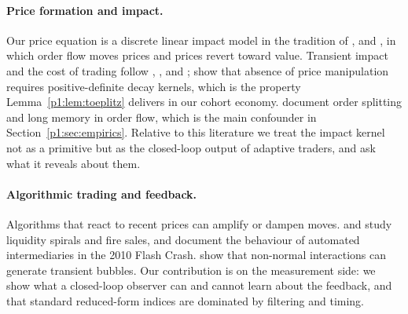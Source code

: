 \paragraph{Price formation and impact.} Our price equation is a discrete linear impact model in the tradition of \citet{p1:kyle1985}, \citet{p1:glosten1985} and \citet{p1:hasbrouck1991}, in which order flow moves prices and prices revert toward value. Transient impact and the cost of trading follow \citet{p1:almgren2001}, \citet{p1:obizhaeva2013}, \citet{p1:gatheral2010} and \citet{p1:bouchaud2004}; \citet{p1:alfonsi2016} show that absence of price manipulation requires positive-definite decay kernels, which is the property Lemma~\ref{p1:lem:toeplitz} delivers in our cohort economy. \citet{p1:bouchaud2018} document order splitting and long memory in order flow, which is the main confounder in Section~\ref{p1:sec:empirics}. Relative to this literature we treat the impact kernel not as a primitive but as the closed-loop output of adaptive traders, and ask what it reveals about them.

\paragraph{Algorithmic trading and feedback.} Algorithms that react to recent prices can amplify or dampen moves. \citet{p1:brunnermeier2009} and \citet{p1:shleifer1992} study liquidity spirals and fire sales, and \citet{p1:kirilenko2017} document the behaviour of automated intermediaries in the 2010 Flash Crash. \citet{p1:sornette2023} show that non-normal interactions can generate transient bubbles. Our contribution is on the measurement side: we show what a closed-loop observer can and cannot learn about the feedback, and that standard reduced-form indices are dominated by filtering and timing.


